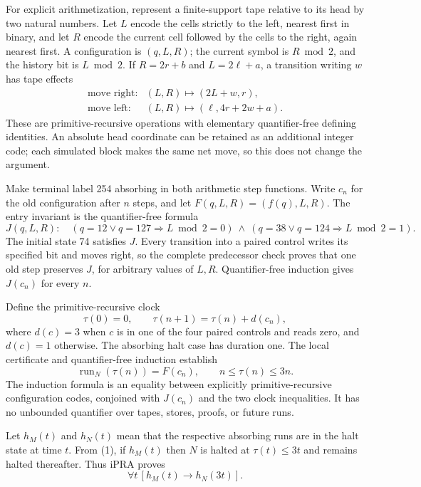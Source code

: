 For explicit arithmetization, represent a finite-support tape relative
to its head by two natural numbers.  Let $L$ encode the cells strictly
to the left, nearest first in binary, and let $R$ encode the current
cell followed by the cells to the right, again nearest first.  A
configuration is $(q,L,R)$; the current symbol is $R\bmod2$, and the
history bit is $L\bmod2$.  If $R=2r+b$ and $L=2\ell+a$, a transition
writing $w$ has tape effects
\[
 \begin{array}{ll}
 \text{move right}:&(L,R)\mapsto(2L+w,r),\\
 \text{move left}: &(L,R)\mapsto(\ell,4r+2w+a).
 \end{array}
\]
These are primitive-recursive operations with elementary quantifier-free
defining identities.  An absolute head coordinate can be retained as
an additional integer code; each simulated block makes the same net
move, so this does not change the argument.

Make terminal label 254 absorbing in both arithmetic step functions.
Write $c_n$ for the old configuration after $n$ steps, and let
$F(q,L,R)=(f(q),L,R)$.  The entry invariant is the quantifier-free formula
\[
 J(q,L,R):\quad
 (q=12\lor q=127\Rightarrow L\bmod2=0)\ \wedge\
 (q=38\lor q=124\Rightarrow L\bmod2=1).
\]
The initial state 74 satisfies $J$.  Every transition into a paired
control writes its specified bit and moves right, so the complete
predecessor check proves that one old step preserves $J$, for arbitrary
values of $L,R$.  Quantifier-free induction gives $J(c_n)$ for every $n$.

Define the primitive-recursive clock
\[
 \tau(0)=0,\qquad
 \tau(n+1)=\tau(n)+d(c_n),
\]
where $d(c)=3$ when $c$ is in one of the four paired controls and reads
zero, and $d(c)=1$ otherwise.  The absorbing halt case has duration one.
The local certificate and quantifier-free induction establish
\[
 \operatorname{run}_N(\tau(n))=F(c_n),\qquad
 n\le\tau(n)\le3n.                                      \tag{1}
\]
The induction formula is an equality between explicitly
primitive-recursive configuration codes, conjoined with $J(c_n)$ and the
two clock inequalities.  It has no unbounded quantifier over tapes,
stores, proofs, or future runs.

Let $h_M(t)$ and $h_N(t)$ mean that the respective absorbing runs are in
the halt state at time $t$.  From (1), if $h_M(t)$ then $N$ is halted at
$\tau(t)\le3t$ and remains halted thereafter.  Thus iPRA proves
\[
 \forall t\,[h_M(t)\to h_N(3t)].                          \tag{2}
\]

